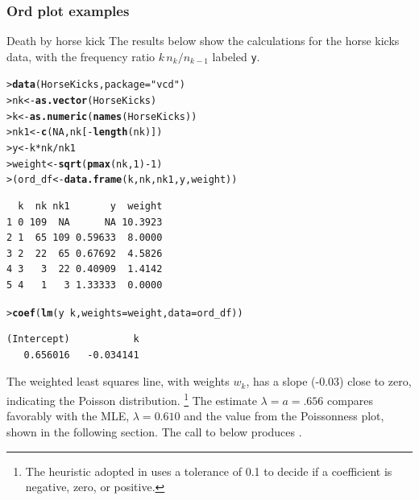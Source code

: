 \documentclass[10pt,krantz2]{krantz}\usepackage[]{graphicx}\usepackage[]{color}
\makeatletter
\newcommand{\hlnum}[1]{\textcolor[rgb]{0.686,0.059,0.569}{#1}}%
\newcommand{\hlstr}[1]{\textcolor[rgb]{0.192,0.494,0.8}{#1}}%
\newcommand{\hlopt}[1]{\textcolor[rgb]{0,0,0}{#1}}%
\newcommand{\hlstd}[1]{\textcolor[rgb]{0.345,0.345,0.345}{#1}}%
\newcommand{\hlkwb}[1]{\textcolor[rgb]{0.69,0.353,0.396}{#1}}%
\newcommand{\hlkwc}[1]{\textcolor[rgb]{0.333,0.667,0.333}{#1}}%
\newcommand{\hlkwd}[1]{\textcolor[rgb]{0.737,0.353,0.396}{\textbf{#1}}}%
\newenvironment{kframe}{%
 \def\at@end@of@kframe{}%
 \ifinner\ifhmode%
  \def\at@end@of@kframe{\end{minipage}}%
  \begin{minipage}{\columnwidth}%
 \fi\fi%
 \def\FrameCommand##1{\hskip\@totalleftmargin \hskip-\fboxsep
 \colorbox{shadecolor}{##1}\hskip-\fboxsep
     \hskip-\linewidth \hskip-\@totalleftmargin \hskip\columnwidth}%
 \MakeFramed {\advance\hsize-\width
   \@totalleftmargin\z@ \linewidth\hsize
   \@setminipage}}%
 {\par\unskip\endMakeFramed%
 \at@end@of@kframe}
\newenvironment{knitrout}{}{} %
\renewenvironment{knitrout}{\small\renewcommand{\baselinestretch}{.85}}{} %
\makeatother
\begin{document}

\subsubsection{Ord plot examples}
\begin{Example}[horsekick3]{Death by horse kick}
The results below show the calculations for
the horse kicks data, with the frequency ratio \({ k \,  n_k } /  { n_{k-1}
}\) labeled \texttt{y}.

\begin{knitrout}
\color{fgcolor}\begin{kframe}
\begin{alltt}
\hlstd{> }\hlkwd{data}\hlstd{(HorseKicks,} \hlkwc{package} \hlstd{=} \hlstr{"vcd"}\hlstd{)}
\hlstd{> }\hlstd{nk} \hlkwb{<-} \hlkwd{as.vector}\hlstd{(HorseKicks)}
\hlstd{> }\hlstd{k} \hlkwb{<-} \hlkwd{as.numeric}\hlstd{(}\hlkwd{names}\hlstd{(HorseKicks))}
\hlstd{> }\hlstd{nk1} \hlkwb{<-} \hlkwd{c}\hlstd{(}\hlnum{NA}\hlstd{, nk[}\hlopt{-}\hlkwd{length}\hlstd{(nk)])}
\hlstd{> }\hlstd{y} \hlkwb{<-} \hlstd{k} \hlopt{*} \hlstd{nk} \hlopt{/} \hlstd{nk1}
\hlstd{> }\hlstd{weight} \hlkwb{<-} \hlkwd{sqrt}\hlstd{(}\hlkwd{pmax}\hlstd{(nk,} \hlnum{1}\hlstd{)} \hlopt{-} \hlnum{1}\hlstd{)}
\hlstd{> }\hlstd{(ord_df} \hlkwb{<-} \hlkwd{data.frame}\hlstd{(k, nk, nk1, y, weight))}
\end{alltt}
\begin{verbatim}
  k  nk nk1       y  weight
1 0 109  NA      NA 10.3923
2 1  65 109 0.59633  8.0000
3 2  22  65 0.67692  4.5826
4 3   3  22 0.40909  1.4142
5 4   1   3 1.33333  0.0000
\end{verbatim}
\begin{alltt}
\hlstd{> }\hlkwd{coef}\hlstd{(}\hlkwd{lm}\hlstd{(y} \hlopt{~} \hlstd{k,} \hlkwc{weights} \hlstd{= weight,} \hlkwc{data} \hlstd{= ord_df))}
\end{alltt}
\begin{verbatim}
(Intercept)           k 
   0.656016   -0.034141 
\end{verbatim}
\end{kframe}
\end{knitrout}

The weighted least squares line, with weights
\(w_k\), has a slope (-0.03) close to zero, indicating the Poisson
distribution.%
\footnote{
The heuristic adopted in  uses a tolerance of 0.1
to decide if a coefficient is negative, zero, or positive.
}
The estimate \(\lambda = a = .656\) compares
favorably with the MLE, $\lambda=0.610$ and the
value from the Poissonness plot, shown in the
following section.  The call to  below
produces .


\end{Example}
\end{document}
